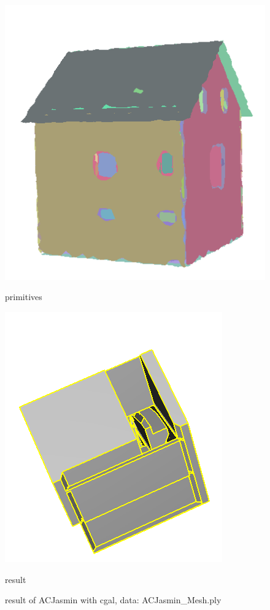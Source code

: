 \documentclass{article}
\begin{document}
\begin{figure}[H]
\begin{minipage}[t]{0.29\textwidth}
    \includegraphics[width=\textwidth]{../../images/screen_kinetic/ACJasmin_primitive.png}
    \caption*{primitives}
  \end{minipage}
  \begin{minipage}[t]{0.27\textwidth}
    \includegraphics[width=\textwidth]{../../images/screen_kinetic/ACJasmin_result_INRIA.png}
    \caption*{result}
  \end{minipage}
  \caption{result of ACJasmin with cgal, data: ACJasmin\_Mesh.ply}
\end{figure}  
\end{document}
